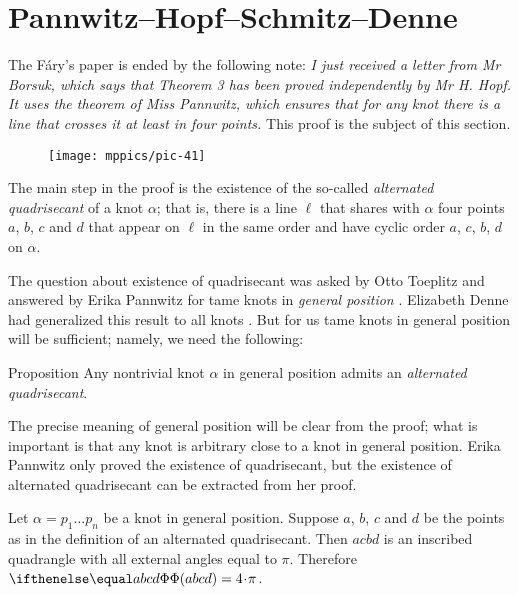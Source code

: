 \section{Pannwitz--Hopf--Schmitz--Denne}\label{sec:quadrisecant}

The F\'ary's paper \cite{fary} is ended by the following note:
\textit{I just received a letter from Mr Borsuk, which says that Theorem 3 has been proved independently by Mr H. Hopf.
It uses the theorem of Miss Pannwitz, which ensures that for any knot there is a line that crosses it at least in four
points.}
This proof is the subject of this section.

\begin{wrapfigure}{r}{22 mm}
\vskip-4mm
\centering
\texttt{[image: mppics/pic-41]}
\vskip0mm
\end{wrapfigure}

The main step in the proof is the existence of the so-called \emph{alternated quadrisecant} of a knot $\alpha$; that is, there is a line $\ell$ that shares with $\alpha$ four points $a$, $b$, $c$ and $d$
that appear on $\ell$ in the same order and have cyclic order $a$, $c$, $b$, $d$ on $\alpha$.

The question about existence of quadrisecant was asked by Otto Toep\-litz and answered by Erika Pannwitz for tame knots in \emph{general position} \cite{pannwitz}.
Elizabeth Denne had generalized this result to all knots \cite{denne, denne-survey}.
But for us tame knots in general position will be sufficient;
namely, we need the following:

\begin{thm}{Proposition}\label{prop:quadrisecant}
Any nontrivial knot $\alpha$ in general position admits an \emph{alternated quadrisecant}.
\end{thm}

The precise meaning of general position will be clear from the proof;
what is important is that any knot is arbitrary close to a knot in general position.
Erika Pannwitz only proved the existence of quadrisecant, but the existence of alternated quadrisecant can be extracted from her proof.

Let $\alpha=p_1\dots p_n$ be a knot in general position.
Suppose $a$, $b$, $c$ and $d$ be the points as in the definition of an alternated quadrisecant.
Then $acbd$ is an inscribed quadrangle with all external angles equal to $\pi$.
Therefore $\tc{abcd}=4\cdot\pi$.


